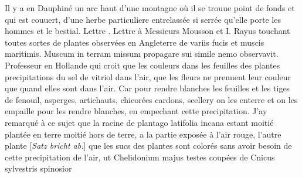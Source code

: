 \newpage
\count{}
\count{}
\count{}
\pstart%
Il y a en Dauphin\'{e}\protect{} un arc haut d'une montagne o\`{u} il se trouue point de fonds et qui est couuert, d'une herbe particuliere entrelass\'{e}e si serr\'{e}e qu'elle porte les hommes et le bestial.
\pend%
%
\pstart%
Lettre \protect{}. Lettre \`{a} Messieurs Mousson et I. Rayus touchant toutes sortes de plantes observ\'{e}es en Angleterre\protect{} de variis fucis et muscis maritimis\protect{}. Muscum\protect{} in terram missum propagare sui simile nemo observavit. Professeur en Hollande\protect{} qui croit que les couleurs dans les feuilles des plantes precipitations du sel de vitriol\protect{} dans l'air, que les fleurs ne prennent leur couleur que quand elles sont dans l'air. Car pour rendre blanches
les feuilles et les tiges de fenouil\protect{}, asperges\protect{}, artichauts\protect{}, chicor\'{e}es\protect{} cardons\protect{}, scellery\protect{} on les enterre et on les empaille pour les rendre blanches, en empechant cette precipitation. J'ay remarqu\'{e} \`{a} ce sujet que la racine de plantago latifolia incana\protect{} 
%
estant moiti\'{e} plant\'{e}e en terre moiti\'{e} hors de terre, a la partie expos\'{e}e \`{a} l'air rouge, l'autre plante [\textit{Satz bricht ab.}]
\pend%
%
\pstart%
que les sucs des plantes sont color\'{e}s sans avoir besoin de cette precipitation de l'air, ut Chelidonium\protect{} majus
%
testes coup\'{e}es de Cnicus sylvestris\protect{} spinosior
